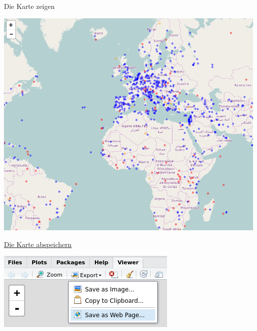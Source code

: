 \documentclass[ignorenonframetext,]{beamer}
\begin{document}
\begin{frame}{Die Karte zeigen}
\protect\hypertarget{die-karte-zeigen-1}{}

\includegraphics{figure/WHCcircles.PNG}

\end{frame}

\begin{frame}{\href{http://www.r-bloggers.com/interactive-mapping-with-leaflet-in-r-2/}{Die
Karte abspeichern}}
\protect\hypertarget{die-karte-abspeichern}{}

\includegraphics{figure/snapshot2.png}

\end{frame}
\end{document}
